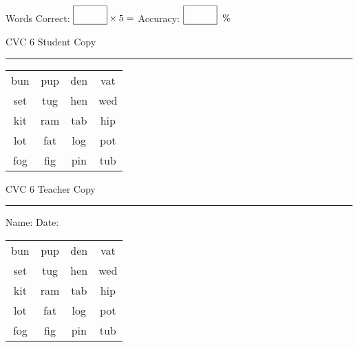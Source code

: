 \documentclass{memoir}
\begin{document}
\small

Words Correct: $\fbox{\phantom{\huge 100}} \times 5 = $ Accuracy: $\fbox{\phantom{\huge 100}}\;\; \%$ 

\vfill

\newpage


\footnotesize \noindent
CVC 6 \hfill Student Copy
\smallskip
\hrule

\Large

\setlength{\tabcolsep}{14pt}
\def\arraystretch{2}

{\selectfont


\begin{vplace}[0.5]
\begin{center}
\begin{tabular}{cccc}
bun & pup & den & vat \\
set & tug & hen & wed \\
kit & ram & tab & hip \\
lot & fat & log & pot \\
fog & fig & pin & tub \\
\end{tabular}
\end{center}
\end{vplace}

}

\newpage

\footnotesize \noindent
CVC 6 \hfill Teacher Copy
\smallskip
\hrule

\small

\vfill

\noindent
Name: \underline{\hspace{1.75in}} \hfill Date: \underline{\hspace{1in}}

\Large

{\selectfont


\begin{vplace}[0.5]
\begin{center}
\begin{tabular}{cccc}
bun & pup & den & vat \\
set & tug & hen & wed \\
kit & ram & tab & hip \\
lot & fat & log & pot \\
fog & fig & pin & tub \\
\end{tabular}
\end{center}
\end{vplace}



}
\end{document}
